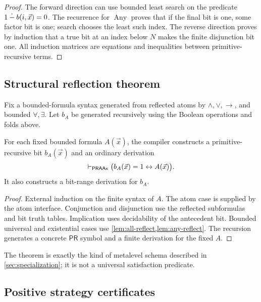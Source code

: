 \begin{proof}
The forward direction can use bounded least search on the predicate
\(1\mathbin{\dot{-}} b(i,\vec x)=0\).  The recurrence for \(\operatorname{Any}\)
proves that if the final bit is one, some factor bit is one; search chooses the
least such index.  The reverse direction proves by induction that a true bit at
an index below \(N\) makes the finite disjunction bit one.  All induction
matrices are equations and inequalities between primitive-recursive terms.
\end{proof}

\subsection{Structural reflection theorem}

Fix a bounded-formula syntax generated from reflected atoms by
\(\wedge,\vee,\to\), and bounded \(\forall,\exists\).  Let \(b_A\) be generated
recursively using the Boolean operations and folds above.

\begin{theorem}
\label{thm:bounded-reflection}
For each fixed bounded formula \(A(\vec x)\), the compiler constructs a
primitive-recursive bit \(b_A(\vec x)\) and an ordinary derivation
\[
  \vdash_{\mathsf{PRAAx}}
  \bigl(b_A(\vec x)=1\leftrightarrow A(\vec x)\bigr).
\]
It also constructs a bit-range derivation for \(b_A\).
\end{theorem}

\begin{proof}
External induction on the finite syntax of \(A\).  The atom case is supplied
by the atom interface.  Conjunction and disjunction use the reflected
subformulas and bit truth tables.  Implication uses decidability of the
antecedent bit.  Bounded universal and existential cases use
\cref{lem:all-reflect,lem:any-reflect}.  The recursion generates a concrete
\(\mathsf{PR}\) symbol and a finite derivation for the fixed \(A\).
\end{proof}

The theorem is exactly the kind of metalevel schema described in
\cref{sec:specialization}; it is not a universal satisfaction predicate.

\subsection{Positive strategy certificates}


